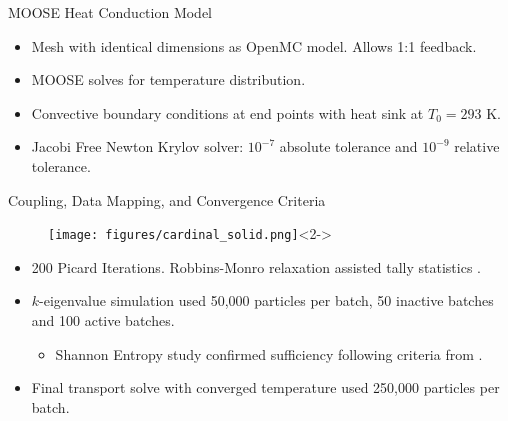 \documentclass[9pt,t]{beamer}
\begin{document}
\begin{frame}{MOOSE Heat Conduction Model}
    \pause
    \begin{itemize}
        \item <2-> Mesh with identical dimensions as OpenMC model. Allows 1:1 feedback.
        \item <3-> MOOSE solves for temperature distribution.
        \item <4-> Convective boundary conditions at end points with heat sink at $T_{0}=293$ K.
        \item <5-> Jacobi Free Newton Krylov solver: $10^{-7}$ absolute tolerance and $10^{-9}$ relative tolerance.
    \end{itemize}
\end{frame}

\begin{frame}{Coupling, Data Mapping, and Convergence Criteria}
    \pause
    \begin{figure}[T]
        \centering
        \texttt{[image: figures/cardinal\_solid.png]}<2->
    \end{figure}
    \begin{itemize}
        \item <3-> 200 Picard Iterations. Robbins-Monro relaxation assisted tally statistics \cite{dufek}.
        \item <4-> $k$-eigenvalue simulation used 50,000 particles per batch, 50 inactive batches and 100 active batches.
        \begin{itemize}
            \item <5-> Shannon Entropy study confirmed sufficiency following criteria from \cite{brown-entropy-2006}.
        \end{itemize}
        \item <6-> Final transport solve with converged temperature used 250,000 particles per batch.
    \end{itemize}
\end{frame}


\end{document}
